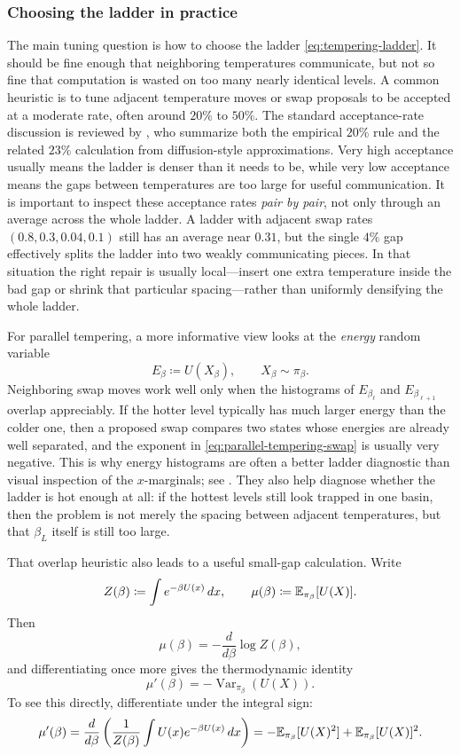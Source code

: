 \subsubsection{Choosing the ladder in practice}
\label{subsubsec:tempering-tuning}

The main tuning question is how to choose the ladder \eqref{eq:tempering-ladder}.
It should be fine enough that neighboring temperatures communicate, but not so fine that computation is wasted on too many nearly identical levels.
A common heuristic is to tune adjacent temperature moves or swap proposals to be accepted at a moderate rate, often around $20\%$ to $50\%$.
The standard acceptance-rate discussion is reviewed by \citet[\S2.3]{earl_deem_2005_parallel_tempering}, who summarize both the empirical $20\%$ rule and the related $23\%$ calculation from diffusion-style approximations.
Very high acceptance usually means the ladder is denser than it needs to be, while very low acceptance means the gaps between temperatures are too large for useful communication.
It is important to inspect these acceptance rates \emph{pair by pair}, not only through an average across the whole ladder.
A ladder with adjacent swap rates $(0.8,0.3,0.04,0.1)$ still has an average near $0.31$, but the single $4\%$ gap effectively splits the ladder into two weakly communicating pieces.
In that situation the right repair is usually local---insert one extra temperature inside the bad gap or shrink that particular spacing---rather than uniformly densifying the whole ladder.

For parallel tempering, a more informative view looks at the \emph{energy} random variable
\[
  E_\beta \coloneqq U(X_\beta),
  \qquad
  X_\beta \sim \pi_\beta.
\]
Neighboring swap moves work well only when the histograms of $E_{\beta_\ell}$ and $E_{\beta_{\ell+1}}$ overlap appreciably.
If the hotter level typically has much larger energy than the colder one, then a proposed swap compares two states whose energies are already well separated, and the exponent in \eqref{eq:parallel-tempering-swap} is usually very negative.
This is why energy histograms are often a better ladder diagnostic than visual inspection of the $x$-marginals; see \citet[\S2.3]{earl_deem_2005_parallel_tempering}.
They also help diagnose whether the ladder is hot enough at all:
if the hottest levels still look trapped in one basin, then the problem is not merely the spacing between adjacent temperatures, but that $\beta_L$ itself is still too large.

That overlap heuristic also leads to a useful small-gap calculation.
Write
\[
  Z(\beta) \coloneqq \int e^{-\beta U(x)}\,dx,
  \qquad
  \mu(\beta) \coloneqq \mathbb{E}_{\pi_\beta}[U(X)].
\]
Then
\[
  \mu(\beta)
  =
  -\frac{d}{d\beta}\log Z(\beta),
\]
and differentiating once more gives the thermodynamic identity
\begin{equation}
  \mu'(\beta)
  =
  -\operatorname{Var}_{\pi_\beta}(U(X)).
  \label{eq:tempering-thermodynamic-identity}
\end{equation}
To see this directly, differentiate under the integral sign:
\[
  \mu'(\beta)
  =
  \frac{d}{d\beta}
  \left(
    \frac{1}{Z(\beta)}\int U(x)e^{-\beta U(x)}\,dx
  \right)
  =
  -\mathbb{E}_{\pi_\beta}[U(X)^2] + \mathbb{E}_{\pi_\beta}[U(X)]^2.
\]

